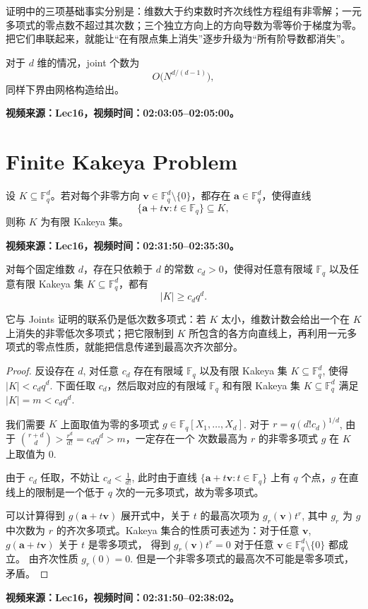 证明中的三项基础事实分别是：维数大于约束数时齐次线性方程组有非零解；一元多项式的零点数不超过其次数；三个独立方向上的方向导数为零等价于梯度为零。把它们串联起来，就能让“在有限点集上消失”逐步升级为“所有阶导数都消失”。

对于 $d$ 维的情况，joint 个数为
\[
O\bigl(N^{d/(d-1)}\bigr),
\]
同样下界由网格构造给出。

\ifdefined\VideoNotesTestMode
\textbf{视频来源：Lec16，视频时间：02:03:05--02:05:00。}
\fi

\section{Finite Kakeya Problem}

\begin{definition}[有限 Kakeya 集]
设 \(K\subseteq\mathbb{F}_q^d\)。若对每个非零方向
\(\mathbf v\in\mathbb{F}_q^d\setminus\{0\}\)，都存在
\(\mathbf a\in\mathbb{F}_q^d\)，使得直线
\[
\{\mathbf a+t\mathbf v:t\in\mathbb{F}_q\}\subseteq K,
\]
则称 \(K\) 为有限 Kakeya 集。

\ifdefined\VideoNotesTestMode
\textbf{视频来源：Lec16，视频时间：02:31:50--02:35:30。}
\fi
\end{definition}

\begin{theorem}
对每个固定维数 \(d\)，存在只依赖于 \(d\) 的常数
\(c_d>0\)，使得对任意有限域 \(\mathbb{F}_q\) 以及任意有限
Kakeya 集 \(K\subseteq\mathbb{F}_q^d\)，都有
\[
|K|\geq c_dq^d.
\]
\end{theorem}

它与 Joints 证明的联系仍是低次数多项式：若 $K$ 太小，维数计数会给出一个在 $K$ 上消失的非零低次多项式；把它限制到 $K$ 所包含的各方向直线上，再利用一元多项式的零点性质，就能把信息传递到最高次齐次部分。

\begin{proof}
反设存在 $d$, 对任意 $c_d$ 存在有限域 \(\mathbb{F}_q\) 以及有限
Kakeya 集 \(K\subseteq\mathbb{F}_q^d\), 使得 $|K|< c_dq^d$. 
下面任取 $c_d$，然后取对应的有限域 \(\mathbb{F}_q\) 和有限 Kakeya 集 \(K\subseteq\mathbb{F}_q^d\)
满足 $|K|=m< c_dq^d$. 

我们需要 $K$ 上面取值为零的多项式 $g\in\mathbb F_q[X_1,\dots,X_d]$. 
对于 $r=q\left(d!c_d\right)^{1/d}$, 由于 ${r+d\choose d}>\frac{r^d}{d!}=c_dq^d>m$，一定存在一个
次数最高为 $r$ 的非零多项式 $g$ 在 $K$ 上取值为 0.

由于 $c_d$ 任取，不妨让 $c_d<\frac{1}{d!}$, 此时由于直线 
$\{\mathbf a+t\mathbf v:t\in \mathbb F_q\}$ 
上有 $q$ 个点，$g$ 在直线上的限制是一个低于 $q$ 次的一元多项式，故为零多项式。

可以计算得到 $g(\mathbf a+t\mathbf v)$ 展开式中，关于 $t$ 的最高次项为 $g_r(\mathbf v)t^r$, 
其中 $g_r$ 为 $g$ 中次数为 $r$ 的齐次多项式。Kakeya 集合的性质可表述为：对于任意 $\mathbf v$,
$g(\mathbf a+t\mathbf v)$ 关于 $t$ 是零多项式，
得到 $g_r(\mathbf v)t^r=0$ 对于任意 $\mathbf v\in\mathbb F_q^d\setminus\{0\}$ 都成立。
由齐次性质 $g_r(0)=0$. 但是一个非零多项式的最高次不可能是零多项式，矛盾。

\end{proof}

\ifdefined\VideoNotesTestMode
\textbf{视频来源：Lec16，视频时间：02:31:50--02:38:02。}
\fi
